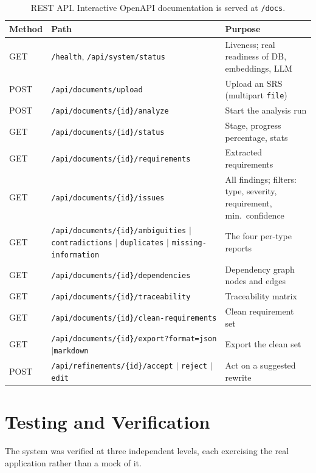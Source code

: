 \begin{table}[h!]
\centering\small
\begin{tabular}{@{}p{1.2cm} p{7.4cm} p{6.6cm}@{}}
\toprule
\textbf{Method} & \textbf{Path} & \textbf{Purpose} \\
\midrule
GET & \texttt{/health}, \texttt{/api/system/status} & Liveness; real readiness of DB, embeddings, LLM \\
POST & \texttt{/api/documents/upload} & Upload an SRS (multipart \texttt{file}) \\
POST & \texttt{/api/documents/\{id\}/analyze} & Start the analysis run \\
GET & \texttt{/api/documents/\{id\}/status} & Stage, progress percentage, stats \\
GET & \texttt{/api/documents/\{id\}/requirements} & Extracted requirements \\
GET & \texttt{/api/documents/\{id\}/issues} & All findings; filters: type, severity, requirement, min.\ confidence \\
GET & \texttt{/api/documents/\{id\}/ambiguities} $\vert$ \texttt{contradictions} $\vert$ \texttt{duplicates} $\vert$ \texttt{missing-information} & The four per-type reports \\
GET & \texttt{/api/documents/\{id\}/dependencies} & Dependency graph nodes and edges \\
GET & \texttt{/api/documents/\{id\}/traceability} & Traceability matrix \\
GET & \texttt{/api/documents/\{id\}/clean-requirements} & Clean requirement set \\
GET & \texttt{/api/documents/\{id\}/export?format=json$\vert$markdown} & Export the clean set \\
POST & \texttt{/api/refinements/\{id\}/accept} $\vert$ \texttt{reject} $\vert$ \texttt{edit} & Act on a suggested rewrite \\
\bottomrule
\end{tabular}
\caption{REST API. Interactive OpenAPI documentation is served at \texttt{/docs}.}
\end{table}

\section{Testing and Verification}

The system was verified at three independent levels, each exercising the real
application rather than a mock of it.

